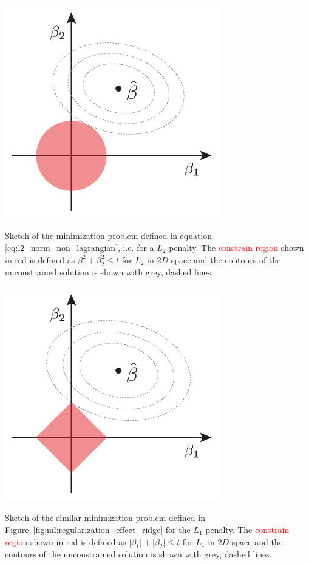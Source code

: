 \documentclass[a4paper, twoside, nobib]{tufte-book}
\newcommand{\abs}[1]{\lvert#1\rvert}
\begin{document}
\begin{marginfigure}
  \includegraphics[width=0.7\textwidth]{figures/ridge_lasso_sparse/ridge.pdf}
  \caption[Regularization Effect of $L_2$ ]
    {Sketch of the minimization problem defined in equation \eqref{eq:l2_norm_non_lagrangian}, i.e. for a $L_2$-penalty. The \textcolor{red}{constrain region} shown in red is defined as $\beta_1^2 + \beta_2^2 \leq t$ for $L_2$ in $2D$-space and the contours of the unconstrained solution is shown with grey, dashed lines. 
    }
  \label{fig:ml:regularization_effect_ridge}
\end{marginfigure}
\begin{marginfigure}
  \includegraphics[width=0.7\textwidth]{figures/ridge_lasso_sparse/lasso.pdf}
  \caption[Regularization Effect of $L_1$]
    {Sketch of the similar minimization problem defined in Figure~\ref{fig:ml:regularization_effect_ridge} for the $L_1$-penalty. The \textcolor{red}{constrain region} shown in red is defined as $\abs{\beta_1} + \abs{\beta_2} \leq t$ for $L_1$ in $2D$-space and the contours of the unconstrained solution is shown with grey, dashed lines.
    }
  \label{fig:ml:regularization_effect_lasso}
\end{marginfigure} 
\end{document}
